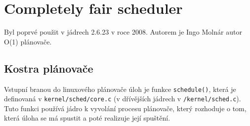 \documentclass[
  master=true,
  font=sans,
  printversion=false,
  joinlists=true,
  figures=true,
  tables=true,
  sourcecodes=false,
  theorems=false,
  bibencoding=utf8,
  language=czech,
  encoding=utf8,
  field=ainfk,
  biblatex,
  glossaries,
  index
]{kidiplom}
\begin{document}
\section{Completely fair scheduler}%

Byl poprvé použit v jádrech 2.6.23 v roce 2008. Autorem je Ingo Molnár autor O(1) plánovače.

\subsection{Kostra plánovače}
Vstupní branou do linuxového plánovače úloh je funkce \verb#schedule()#, která je definovaná v \verb#kernel/sched/core.c# (v dřívějších jádrech v \verb#/kernel/sched.c#). Tuto funkci používá jádro k vyvolání procesu plánovače, který rozhoduje o tom, která úloha se má spustit a poté realizuje její spuštění. 
\end{document}
